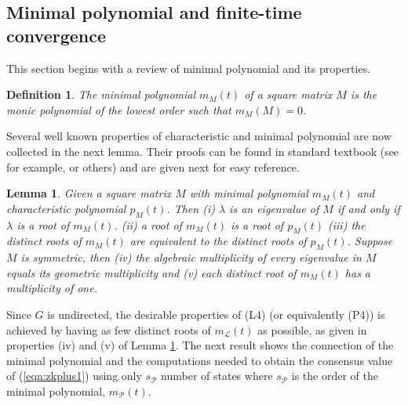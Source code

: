 \documentclass[onecolumn,reviewcopy]{autart}
\def \L{\mathcal{L}}
\def \P{\mathcal{P}}
\newtheorem{lemma}{Lemma}
\newtheorem{definition}{Definition}
\begin{document}
\subsection{Minimal polynomial and finite-time convergence}
This section begins with a review of minimal polynomial and its properties.
\begin{definition}
The minimal polynomial $m_M(t)$ of a square matrix $M$ is the monic polynomial of the lowest order such that $m_M(M)=0$.
\end{definition}
Several well known properties of characteristic and minimal polynomial are now collected in the next lemma.
Their proofs can be found in standard textbook (see for example, \cite{BOO:FIS03} or others) and are given next for easy reference.
\begin{lemma} \label{lem:poly}
Given a square matrix $M$ with minimal polynomial $m_M(t)$ and characteristic polynomial $p_M(t)$. Then (i) $\lambda$ is an eigenvalue of $M$ if and only if $\lambda$ is a root of $m_M(t)$. (ii) a root of $m_M(t)$ is a root of $p_M(t)$ (iii) the distinct roots of $m_M(t)$ are equivalent to the distinct roots of $p_M(t)$.  Suppose $M$ is symmetric, then (iv) the algebraic multiplicity of every eigenvalue in $M$ equals its geometric multiplicity and (v) each distinct root of $m_M(t)$ has a multiplicity of one.
\end{lemma}

Since $G$ is undirected, the desirable properties of (L4) (or equivalently (P4)) is achieved by having as few distinct roots of $m_\L(t)$ as possible, as given in properties (iv) and (v) of Lemma \ref{lem:poly}.  The next result shows the connection of the minimal polynomial and the computations needed to obtain the consensus value of (\ref{eqn:zkplus1}) using only $s_\P$ number of states where $s_\P$ is the order of the minimal polynomial, $m_\P(t)$.
\end{document}
